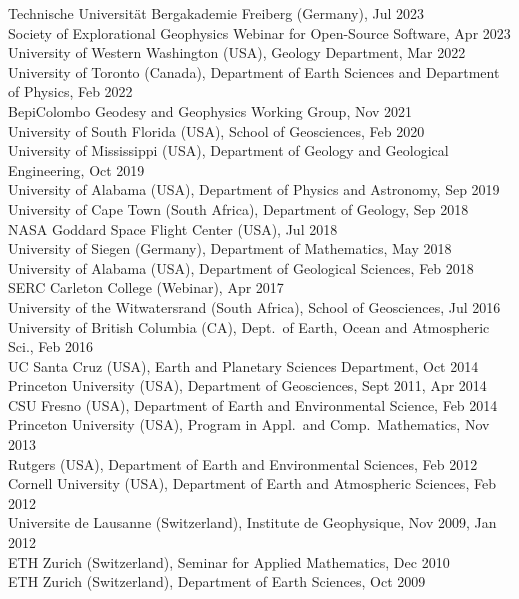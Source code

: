 \documentclass[10pt]{article}
\begin{document}
\spcp
Technische Universität Bergakademie Freiberg (Germany), Jul 2023\\
Society of Explorational Geophysics Webinar for Open-Source Software, Apr 2023\\
University of Western Washington (USA), Geology Department, Mar 2022\\
University of Toronto (Canada), Department of Earth Sciences and Department of Physics, Feb 2022\\
BepiColombo Geodesy and Geophysics Working Group, Nov 2021\\
University of South Florida (USA), School of Geosciences, Feb 2020\\
University of Mississippi (USA), Department of Geology and Geological Engineering, Oct 2019\\
University of Alabama (USA), Department of Physics and Astronomy, Sep 2019\\
University of Cape Town (South Africa), Department of Geology, Sep 2018\\
NASA Goddard Space Flight Center (USA), Jul 2018\\
University of Siegen (Germany), Department of Mathematics, May 2018\\
University of Alabama (USA), Department of Geological Sciences, Feb 2018\\
SERC Carleton College (Webinar), Apr 2017\\
University of the Witwatersrand (South Africa), School of Geosciences, Jul 2016\\
University of British Columbia (CA), Dept.~of Earth, Ocean and Atmospheric Sci., Feb 2016\\
UC Santa Cruz (USA), Earth and Planetary Sciences Department, Oct 2014\\
Princeton University (USA), Department of Geosciences, Sept  2011, Apr 2014\\
CSU Fresno (USA), Department of Earth and Environmental Science, Feb 2014\\
Princeton University (USA), Program in Appl.~and Comp.~Mathematics, Nov 2013\\
Rutgers (USA), Department of Earth and Environmental Sciences, Feb 2012\\
Cornell University (USA), Department of Earth and Atmospheric Sciences, Feb 2012\\
Universite de Lausanne (Switzerland), Institute de Geophysique, Nov 2009, Jan 2012\\
ETH Zurich (Switzerland), Seminar for Applied Mathematics, Dec 2010\\
ETH Zurich (Switzerland), Department of Earth Sciences, Oct 2009
\end{document}
